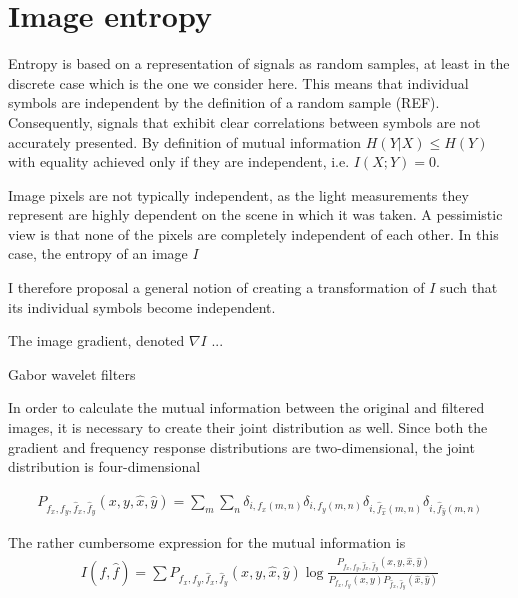 \section{Image entropy}
Entropy is based on a representation of signals as random samples, at least in the discrete case which is the one we consider here. This means that individual symbols are independent by the definition of a random sample (REF). Consequently, signals that exhibit clear correlations between symbols are not accurately presented. By definition of mutual information $H(Y|X) \leq H(Y)$ with equality achieved only if they are independent, i.e. $I(X;Y) = 0$. 

Image pixels are not typically independent, as the light measurements they represent are highly dependent on the scene in which it was taken. A pessimistic view is that none of the pixels are completely independent of each other. In this case, the entropy of an image $I$ 

I therefore proposal a general notion of creating a transformation of $I$ such that its individual symbols become independent. 

The image gradient, denoted $\nabla I$ ...

Gabor wavelet filters 

In order to calculate the mutual information between the original and filtered images, it is necessary to create their joint distribution as well. Since both the gradient and frequency response distributions are two-dimensional, the joint distribution is four-dimensional

\begin{multline}
    P_{f_x, f_y, \hat{f}_x, \hat{f}_y}(x, y, \hat{x}, \hat{y}) = \sum_m\sum_n \delta_{i, f_x(m, n)}\delta_{i, f_y(m, n)}\delta_{i, \hat{f}_{\hat{x}}(m, n)}\delta_{i, \hat{f}_{\hat{y}}(m, n)}
\end{multline}

The rather cumbersome expression for the mutual information is
\begin{multline}
    I(f, \hat{f}) = \sum P_{f_x, f_y, \hat{f}_x, \hat{f}_y}(x, y, \hat{x}, \hat{y}) \log \frac{P_{f_x, f_y, \hat{f}_x, \hat{f}_y}(x, y, \hat{x}, \hat{y})}{P_{f_x, f_y}(x, y)P_{\hat{f}_x, \hat{f}_y}(\hat{x}, \hat{y})}
\end{multline}


